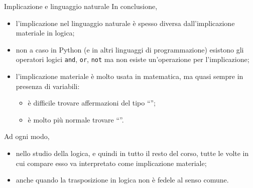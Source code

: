 \documentclass[aspectratio=169,10pt,dvipsnames,handout]{beamer}
\begin{document}
\begin{frame}{Implicazione e linguaggio naturale}
    In conclusione,
    \begin{itemize}
        \item l'implicazione nel linguaggio naturale è spesso diversa dall'implicazione materiale in logica;
        \item non a caso in Python (e in altri linguaggi di programmazione) esistono gli operatori logici \texttt{and}, \texttt{or}, \texttt{not} ma non esiste un'operazione per l'implicazione;
        \item l'implicazione materiale è molto usata in matematica, ma quasi sempre in presenza di variabili:
              \begin{itemize}
                  \item è difficile trovare affermazioni del tipo ``\/'';
                  \item è molto più normale trovare ``\/''.
              \end{itemize}
    \end{itemize}
    \pause
    Ad ogni modo,
    \begin{itemize}
        \item nello studio della logica, e quindi in tutto il resto del corso, tutte le volte in cui compare  esso va interpretato come implicazione materiale;
        \item anche quando la trasposizione in logica non è fedele al senso comune.
    \end{itemize}
\end{frame}
\end{document}
